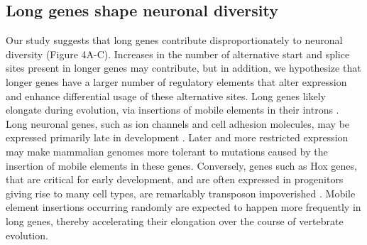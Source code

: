 
\subsection{Long genes shape neuronal diversity}
Our study suggests that long genes contribute disproportionately to neuronal diversity (Figure 4A-C). Increases in the number of alternative start and splice sites present in longer genes may contribute, but in addition, we hypothesize that longer genes have a larger number of regulatory elements that alter expression and enhance differential usage of these alternative sites. Long genes likely elongate during evolution, via insertions of mobile elements in their introns \citep{Sela_2007,Grishkevich_2014}. Long neuronal genes, such as ion channels and cell adhesion molecules, may be expressed primarily late in development \citep{Okaty_2009}. Later and more restricted expression may make mammalian genomes more tolerant to mutations caused by the insertion of mobile elements in these genes. Conversely, genes such as Hox genes, that are critical for early development, and are often expressed in progenitors giving rise to many cell types, are remarkably transposon impoverished \citep{Chinwalla_2002,Simons_2005}. Mobile element insertions occurring randomly are expected to happen more frequently in long genes, thereby accelerating their elongation over the course of vertebrate evolution. %

